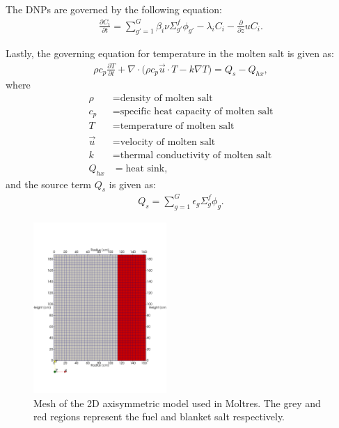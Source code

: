 \documentclass{anstrans}
\begin{document}
	The \glspl{DNP} are governed by the following equation:
%
\begin{align}
	\frac{\partial C_i}{\partial t} = \sum^G_{g'=1} \beta_i \nu \Sigma^f_{g'}
	\phi_{g'} - \lambda_i C_i - \frac{\partial}{\partial z} u C_i. \label{eq2}
\end{align}

	Lastly, the governing equation for temperature in the molten salt is given
	as:
%
\begin{align}
	\rho c_{p} \frac{\partial T}{\partial t} + \nabla \cdot \big( \rho
	c_{p} \overrightarrow{u} \cdot T - k \nabla T \big) = Q_s - Q_{hx},
	\label{eq3}
\end{align}
%
	where
{\small
\begin{align}
	\rho &= \text{density of molten salt} \\
	c_{p} &= \text{specific heat capacity of molten salt} \\
	T &= \text{temperature of molten salt} \\
	\overrightarrow{u} &= \text{velocity of molten salt} \\
	k &= \text{thermal conductivity of molten salt} \\
	Q_{hx} &= \text{heat sink},
\end{align}
}
	and the source term $Q_s$ is given as:
%
\begin{align}
Q_s = \sum^G_{g=1} \epsilon_g \Sigma_g^f \phi_g. \label{eq4}
\end{align}
%
\begin{figure}[h] 
	\centering
	\includegraphics[width=0.45\textwidth]{./figures/mesh}
	\captionsetup{justification=centering}
	\caption{Mesh of the 2D axisymmetric model used in Moltres.
	The grey and red regions represent the fuel and blanket salt respectively.}
	\label{fig:mesh}
\end{figure} 
\end{document}
